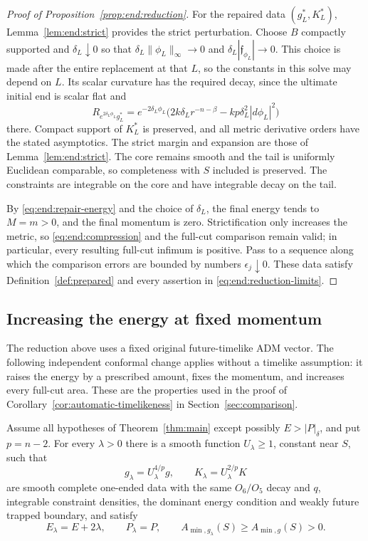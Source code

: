 \begin{proof}[Proof of Proposition~\ref{prop:end:reduction}]
For the repaired data $(g_L^*,K_L^*)$,
Lemma~\ref{lem:end:strict} provides the strict perturbation.
Choose $B$ compactly supported and
$\delta_L\downarrow0$ so that
$\delta_L\|\phi_L\|_\infty\to0$ and
$\delta_L|\mathfrak f_{\phi_L}|\to0$.
This choice is made after the entire replacement at that $L$,
so the constants in this solve may depend on $L$.  Its scalar curvature
has the required decay, since the
ultimate initial end is scalar flat and
\[
 R_{e^{2\delta_L\phi_L}g_L^*}
 =e^{-2\delta_L\phi_L}
       \bigl(2k\delta_L r^{-n-\beta}
                         -kp\delta_L^2|d\phi_L|^2\bigr)
\]
there.  Compact support of $K_L^*$ is preserved, and all metric
derivative orders have the stated asymptotics.  The strict
margin and expansion are those of
Lemma~\ref{lem:end:strict}.  The core remains smooth and the
tail is uniformly Euclidean comparable, so completeness with
$S$ included is preserved.  The constraints are integrable
on the core and have integrable decay on the tail.

By \eqref{eq:end:repair-energy} and the choice of
$\delta_L$, the final energy tends to $M=m>0$, and the final
momentum is zero. Strictification only increases the metric,
so \eqref{eq:end:compression} and the full-cut
comparison remain valid; in particular, every resulting full-cut
infimum is positive. Pass to a sequence along which the comparison
errors are bounded by numbers $\epsilon_j\downarrow0$.
These data satisfy Definition~\ref{def:prepared} and every assertion
in \eqref{eq:end:reduction-limits}.
\end{proof}

\subsection{Increasing the energy at fixed momentum}

The reduction above uses a fixed original future-timelike ADM vector.
The following independent conformal change applies without a timelike
assumption: it raises the energy by a prescribed amount, fixes the
momentum, and increases every full-cut area. These are the properties
used in the proof of Corollary~\ref{cor:automatic-timelikeness} in
Section~\ref{sec:comparison}.

\begin{lemma}
\label{lem:end:positive-shell}
Assume all hypotheses of Theorem~\ref{thm:main} except possibly
$E>|P|_\delta$, and put $p=n-2$. For every $\lambda>0$ there is a smooth function
$U_\lambda\ge1$, constant near $S$, such that
\[
 g_\lambda=U_\lambda^{4/p}g,\qquad
 K_\lambda=U_\lambda^{2/p}K
\]
are smooth complete one-ended data with the same $O_6/O_5$ decay and $q$,
integrable constraint densities, the dominant energy condition and weakly
future trapped boundary, and satisfy
\[
 E_\lambda=E+2\lambda,\qquad P_\lambda=P,\qquad
 A_{\min,g_\lambda}(S)\ge A_{\min,g}(S)>0.
\]
\end{lemma}

